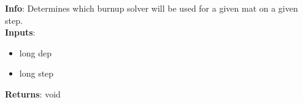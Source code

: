 \textbf{Info}: Determines which burnup solver will be used for a given mat on a 
given step. \\

\noindent \textbf{Inputs}:
\begin{itemize}
\item{long dep}
\item{long step}
\end{itemize}

\noindent \textbf{Returns}: void
